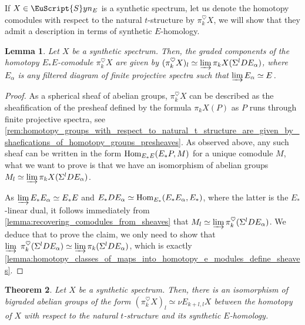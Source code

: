\documentclass[oneside,a4paper]{amsart}
\newcommand{\euscr}[1]{\EuScript{#1}} %
\newcommand{\Hom}{\textnormal{Hom}} %
\newcommand{\synspectra}{\euscr{S}yn} %
\theoremstyle{plain}
\newtheorem{thm}{Theorem}[section]
\newtheorem{lemma}[thm]{Lemma}
\theoremstyle{definition}
\theoremstyle{remark}
\begin{document}
If $X \in \synspectra_{E}$ is a synthetic spectrum, let us denote the homotopy comodules with respect to the natural $t$-structure by $\pi_{k}^{\heartsuit}X$, we will show that they admit a description in terms of synthetic $E$-homology. 

\begin{lemma}
\label{lemma:formula_for_homotopy_comodules_in_terms_of_a_filtered_colimit}
Let $X$ be a synthetic spectrum. Then, the graded components of the homotopy $E_{*}E$-comodule $\pi_{k}^{\heartsuit}X$ are given by $(\pi_{k}^{\heartsuit} X)_{l} \simeq \varinjlim \pi_{k} X(\Sigma^{l} DE_{\alpha})$, where $E_{\alpha}$ is any filtered diagram of finite projective spectra such that $\varinjlim E_{\alpha} \simeq E$. 
\end{lemma}

\begin{proof}
As a spherical sheaf of abelian groups, $\pi_{k}^{\heartsuit}X$ can be described as the sheafification of the presheaf defined by the formula $\pi_{k} X(P)$ as $P$ runs through finite projective spectra, see \cref{rem:homotopy_groups_with_respect_to_natural_t_structure_are_given_by_shaefications_of_homotopy_groups_presheaves}. As observed above, any such sheaf can be written in the form $\Hom_{E_{*}E}(E_{*}P, M)$ for a unique comodule $M$, what we want to prove is that we have an isomorphism of abelian groups $M_{l} \simeq \varinjlim \pi_{k} X(\Sigma^{l} DE_{\alpha})$. 

As $\varinjlim E_{*} E_{\alpha} \simeq E_{*}E$ and $E_{*} DE_{\alpha} \simeq \Hom_{E_{*}}(E_{*} E_{\alpha}, E_{*})$, where the latter is the $E_{*}$-linear dual, it follows immediately from \cref{lemma:recovering_comodules_from_sheaves} that $M_{l} \simeq \varinjlim \pi_{k}^{\heartsuit}(\Sigma^{l} DE_{\alpha})$. We deduce that to prove the claim, we only need to show that $\varinjlim \ \pi_{k}^{\heartsuit}(\Sigma^{l} DE_{\alpha}) \simeq \varinjlim \pi_{k}(\Sigma^{l} DE_{\alpha})$, which is exactly \cref{lemma:homotopy_classes_of_maps_into_homotopy_e_modules_define_sheaves}.
\end{proof}

\begin{thm}
\label{thm:t_structure_homotopy_groups_coincide_with_synthetic_homology}
Let $X$ be a synthetic spectrum. Then, there is an isomorphism of bigraded abelian groups of the form $(\pi_{k}^{\heartsuit} X)_{l} \simeq \nu E_{k+l, l} X$ between the homotopy of $X$ with respect to the natural $t$-structure and its synthetic $E$-homology. 
\end{thm}
\end{document}
